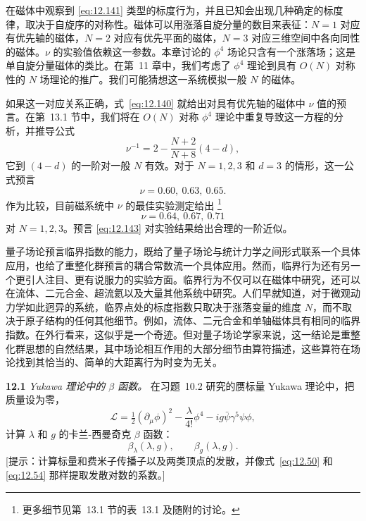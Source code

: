 在磁体中观察到 \eqref{eq:12.141} 类型的标度行为，并且已知会出现几种确定的标度律，取决于自旋序的对称性。磁体可以用涨落自旋分量的数目来表征：$N=1$ 对应有优先轴的磁体，$N=2$ 对应有优先平面的磁体，$N=3$ 对应三维空间中各向同性的磁体。$\nu$ 的实验值依赖这一参数。本章讨论的 $\phi^4$ 场论只含有一个涨落场；这是单自旋分量磁体的类比。在第~11 章中，我们考虑了 $\phi^4$ 理论到具有 $O(N)$ 对称性的 $N$ 场理论的推广。我们可能猜想这一系统模拟一般 $N$ 的磁体。

如果这一对应关系正确，式~\eqref{eq:12.140} 就给出对具有优先轴的磁体中 $\nu$ 值的预言。在第~13.1 节中，我们将在 $O(N)$ 对称 $\phi^4$ 理论中重复导致这一方程的分析，并推导公式
\begin{equation}
  \nu^{-1} = 2 - \frac{N+2}{N+8}(4-d) ,
  \label{eq:12.142}
\end{equation}
它到 $(4-d)$ 的一阶对一般 $N$ 有效。对于 $N = 1, 2, 3$ 和 $d = 3$ 的情形，这一公式预言
\begin{equation}
  \nu = 0.60,\ 0.63,\ 0.65 .
  \label{eq:12.143}
\end{equation}
作为比较，目前磁系统中 $\nu$ 的最佳实验测定给出%
\footnote{更多细节见第~13.1 节的表~13.1 及随附的讨论。}
\begin{equation}
  \nu = 0.64,\ 0.67,\ 0.71
  \label{eq:12.144}
\end{equation}
对 $N = 1, 2, 3$。预言 \eqref{eq:12.143} 对实验结果给出合理的一阶近似。

量子场论预言临界指数的能力，既给了量子场论与统计力学之间形式联系一个具体应用，也给了重整化群预言的耦合常数流一个具体应用。然而，临界行为还有另一个更引人注目、更有说服力的实验方面。临界行为不仅可以在磁体中研究，还可以在流体、二元合金、超流氦以及大量其他系统中研究。人们早就知道，对于微观动力学如此迥异的系统，临界点处的标度指数只取决于涨落变量的维度 $N$，而不取决于原子结构的任何其他细节。例如，流体、二元合金和单轴磁体具有相同的临界指数。在外行看来，这似乎是一个奇迹。但对量子场论学家来说，这一结论是重整化群思想的自然结果，其中场论相互作用的大部分细节由算符描述，这些算符在场论找到其恰当的、简单的大距离行为时变为无关。

\problems

\textbf{12.1} \emph{Yukawa 理论中的 $\beta$ 函数。} 在习题~10.2 研究的赝标量 Yukawa 理论中，把质量设为零，
\begin{equation}
  \mathcal{L} = \tfrac{1}{2}(\partial_\mu\phi)^2 - \frac{\lambda}{4!}\phi^4
    - ig\bar{\psi}\gamma^5\psi\phi ,
\end{equation}
计算 $\lambda$ 和 $g$ 的卡兰-西曼奇克 $\beta$ 函数：
\begin{equation}
  \beta_\lambda(\lambda, g),\qquad \beta_g(\lambda, g) .
\end{equation}
[提示：计算标量和费米子传播子以及两类顶点的发散，并像式~\eqref{eq:12.50} 和 \eqref{eq:12.54} 那样提取发散对数的系数。]

